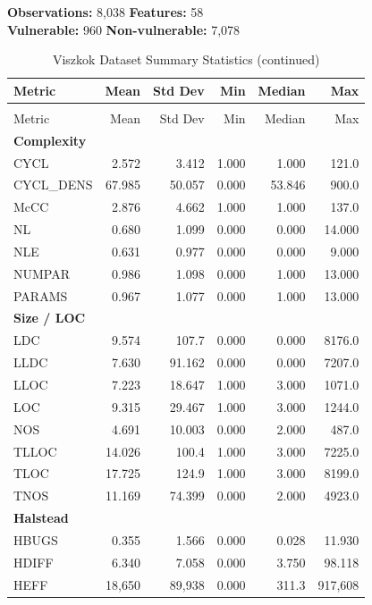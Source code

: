 \noindent\textbf{Observations:} 8,038 \quad
\textbf{Features:} 58\\
\noindent\textbf{Vulnerable:} 960 \quad
\textbf{Non-vulnerable:} 7,078

\small
\begin{longtable}{@{}lrrrrr@{}}
\caption{Viszkok Dataset Summary Statistics}\label{tab:viszkok-dataset-statistics}\\
\toprule
Metric & Mean & Std Dev & Min & Median & Max \\
\midrule
\endfirsthead
\caption[]{Viszkok Dataset Summary Statistics (continued)}\\
\toprule
Metric & Mean & Std Dev & Min & Median & Max \\
\midrule
\endhead
\bottomrule
\endfoot
\textbf{Complexity} & & & & & \\
CYCL & 2.572 & 3.412 & 1.000 & 1.000 & 121.0 \\
CYCL\_DENS & 67.985 & 50.057 & 0.000 & 53.846 & 900.0 \\
McCC & 2.876 & 4.662 & 1.000 & 1.000 & 137.0 \\
NL & 0.680 & 1.099 & 0.000 & 0.000 & 14.000 \\
NLE & 0.631 & 0.977 & 0.000 & 0.000 & 9.000 \\
NUMPAR & 0.986 & 1.098 & 0.000 & 1.000 & 13.000 \\
PARAMS & 0.967 & 1.077 & 0.000 & 1.000 & 13.000 \\
\addlinespace
\textbf{Size / LOC} & & & & & \\
LDC & 9.574 & 107.7 & 0.000 & 0.000 & 8176.0 \\
LLDC & 7.630 & 91.162 & 0.000 & 0.000 & 7207.0 \\
LLOC & 7.223 & 18.647 & 1.000 & 3.000 & 1071.0 \\
LOC & 9.315 & 29.467 & 1.000 & 3.000 & 1244.0 \\
NOS & 4.691 & 10.003 & 0.000 & 2.000 & 487.0 \\
TLLOC & 14.026 & 100.4 & 1.000 & 3.000 & 7225.0 \\
TLOC & 17.725 & 124.9 & 1.000 & 3.000 & 8199.0 \\
TNOS & 11.169 & 74.399 & 0.000 & 2.000 & 4923.0 \\
\addlinespace
\textbf{Halstead} & & & & & \\
HBUGS & 0.355 & 1.566 & 0.000 & 0.028 & 11.930 \\
HDIFF & 6.340 & 7.058 & 0.000 & 3.750 & 98.118 \\
HEFF & 18,650 & 89,938 & 0.000 & 311.3 & 917,608 \\

\end{longtable}
